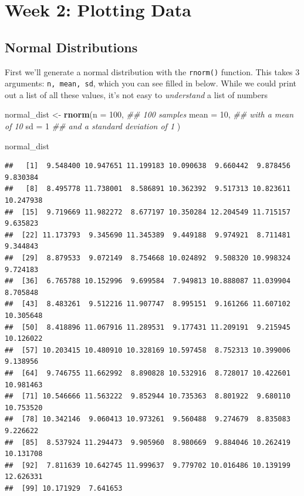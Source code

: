 \documentclass[
]{book}
\newenvironment{Shaded}{\begin{snugshade}}{\end{snugshade}}
\newcommand{\CommentTok}[1]{\textcolor[rgb]{0.56,0.35,0.01}{\textit{#1}}}
\newcommand{\DataTypeTok}[1]{\textcolor[rgb]{0.13,0.29,0.53}{#1}}
\newcommand{\DecValTok}[1]{\textcolor[rgb]{0.00,0.00,0.81}{#1}}
\newcommand{\KeywordTok}[1]{\textcolor[rgb]{0.13,0.29,0.53}{\textbf{#1}}}
\newcommand{\NormalTok}[1]{#1}
\newcommand{\StringTok}[1]{\textcolor[rgb]{0.31,0.60,0.02}{#1}}
\begin{document}
\hypertarget{week-2-plotting-data}{%
\section{Week 2: Plotting Data}\label{week-2-plotting-data}}

\hypertarget{normal-distributions}{%
\subsection{Normal Distributions}\label{normal-distributions}}

First we'll generate a normal distribution with the \texttt{rnorm()} function. This takes 3 arguments: \texttt{n,\ mean,\ sd}, which you can see filled in below. While we could print out a list of all these values, it's not easy to \emph{understand} a list of numbers

\begin{Shaded}
\begin{Highlighting}[]
\NormalTok{normal_dist <-}\StringTok{ }\KeywordTok{rnorm}\NormalTok{(}\DataTypeTok{n =} \DecValTok{100}\NormalTok{, }\CommentTok{## 100 samples}
                     \DataTypeTok{mean =} \DecValTok{10}\NormalTok{, }\CommentTok{## with a mean of 10}
                     \DataTypeTok{sd =} \DecValTok{1} \CommentTok{## and a standard deviation of 1}
\NormalTok{                     )}


\NormalTok{normal_dist}
\end{Highlighting}
\end{Shaded}

\begin{verbatim}
##   [1]  9.548400 10.947651 11.199183 10.090638  9.660442  9.878456  9.830384
##   [8]  8.495778 11.738001  8.586891 10.362392  9.517313 10.823611 10.247938
##  [15]  9.719669 11.982272  8.677197 10.350284 12.204549 11.715157  9.635823
##  [22] 11.173793  9.345690 11.345389  9.449188  9.974921  8.711481  9.344843
##  [29]  8.879533  9.072149  8.754668 10.024892  9.508320 10.998324  9.724183
##  [36]  6.765788 10.152996  9.699584  7.949813 10.888087 11.039904  8.705848
##  [43]  8.483261  9.512216 11.907747  8.995151  9.161266 11.607102 10.305648
##  [50]  8.418896 11.067916 11.289531  9.177431 11.209191  9.215945 10.126022
##  [57] 10.203415 10.480910 10.328169 10.597458  8.752313 10.399006  9.138956
##  [64]  9.746755 11.662992  8.890828 10.532916  8.728017 10.422601 10.981463
##  [71] 10.546666 11.563222  9.852944 10.735363  8.801922  9.680110 10.753520
##  [78] 10.342146  9.060413 10.973261  9.560488  9.274679  8.835083  9.226622
##  [85]  8.537924 11.294473  9.905960  8.980669  9.884046 10.262419 10.131708
##  [92]  7.811639 10.642745 11.999637  9.779702 10.016486 10.139199 12.626331
##  [99] 10.171929  7.641653
\end{verbatim}
\end{document}
